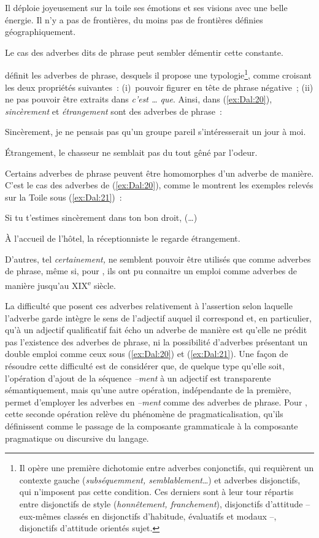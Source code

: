 \documentclass[output=paper]{langsci/langscibook}
\begin{document}
\ea\label{ex:Dal:18} Il déploie joyeusement sur la toile ses émotions et ses visions avec une belle énergie.
\ex\label{ex:Dal:19} Il n'y a pas de frontières, du moins pas de frontières définies géographiquement.
\z

Le cas des adverbes dits de phrase peut sembler démentir cette constante.

%
\citet{Molinier90} %
%
définit les adverbes de phrase, desquels il propose une typologie\footnote{Il opère une première dichotomie entre adverbes conjonctifs, qui requièrent un contexte gauche (\emph{subséquemment, semblablement}\ldots{}) et adverbes disjonctifs, qui n'imposent pas cette condition. Ces derniers sont à leur tour répartis entre disjonctifs de style (\emph{honnêtement, franchement}), disjonctifs d'attitude -- eux-mêmes classés en disjonctifs d'habitude, évaluatifs et modaux --, disjonctifs d'attitude orientés sujet.}, comme croisant les deux propriétés suivantes~: (i)~pouvoir figurer en tête de phrase négative~; (ii) ne pas pouvoir être extraits dans \emph{c'est \ldots{} que}. Ainsi, dans (\ref{ex:Dal:20}), \emph{sincèrement} et \emph{étrangement} sont des adverbes de phrase~:

\ea\label{ex:Dal:20}
    \ea Sincèrement, je ne pensais pas qu'un groupe pareil s'intéresserait un jour à moi.

    \ex Étrangement, le chasseur ne semblait pas du tout gêné par l'odeur.
\z\z

Certains adverbes de phrase peuvent être homomorphes d'un adverbe de manière. C'est le cas des adverbes de (\ref{ex:Dal:20}), comme le montrent les exemples relevés sur la Toile sous (\ref{ex:Dal:21})~:

\ea\label{ex:Dal:21}
    \ea Si tu t'estimes sincèrement dans ton bon droit, (\ldots{})

    \ex À l'accueil de l'hôtel, la réceptionniste le regarde étrangement.
\z\z

D'autres, tel \emph{certainement,} ne semblent pouvoir être utilisés que comme adverbes de phrase, même si, pour %
\citet{Molinier90}%
%
, ils ont pu connaitre un emploi comme adverbes de manière jusqu'au XIX\textsuperscript{e} siècle.

La difficulté que posent ces adverbes relativement à l'assertion selon laquelle l'adverbe garde intègre le sens de l'adjectif auquel il correspond et, en particulier, qu'à un adjectif qualificatif fait écho un adverbe de manière est qu'elle ne prédit pas l'existence des adverbes de phrase, ni la possibilité d'adverbes présentant un double emploi comme ceux sous (\ref{ex:Dal:20}) et (\ref{ex:Dal:21}). Une façon de résoudre cette difficulté est de considérer que, de quelque type qu'elle soit, l'opération d'ajout de la séquence \emph{--ment} à un adjectif est transparente sémantiquement, mais qu'une autre opération, indépendante de la première, permet d'employer les adverbes en \emph{--ment} comme des adverbes de phrase. Pour %
\citet{Lamiroy04}%
%
, cette seconde opération relève du phénomène de pragmaticalisation, qu'ils définissent comme le passage de la composante grammaticale à la composante pragmatique ou discursive du langage.
\end{document}
